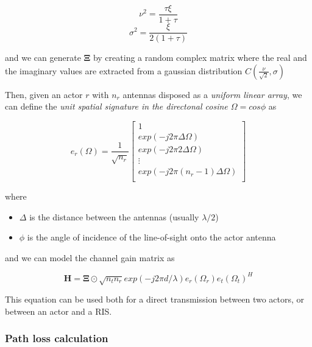 \begin{equation}
  \nu^2 = \frac{\tau \xi}{1 + \tau}
\end{equation}
\begin{equation}
  \sigma^2 = \frac{\xi}{2(1 + \tau)}
\end{equation}

and we can generate $\bm{\Xi}$ by creating a random complex matrix where the real and the imaginary values are extracted from a gaussian distribution $C(\frac{\nu}{\sqrt{2}}, \sigma)$ \cite{Rice_distribution}

Then, given an actor $r$ with $n_r$ antennas disposed as a \textit{uniform linear array}, we can define the \textit{unit spatial signature in the directonal cosine $\Omega = cos \phi$} \cite{Fundamentals_Wireless_Communication_chapter7} as

\begin{equation}
  e_r(\Omega) = \frac{1}{\sqrt{n_r}}
  \begin{bmatrix}
    1                                \\
    exp(-j2\pi\Delta\Omega)          \\
    exp(-j2\pi2\Delta\Omega)         \\
    \vdots                           \\
    exp(-j2\pi(n_r - 1)\Delta\Omega) \\
  \end{bmatrix}
\end{equation}

where
\begin{itemize}
  \item $\Delta$ is the distance between the antennas (usually $\lambda / 2$)
  \item $\phi$ is the angle of incidence of the line-of-sight onto the actor antenna
\end{itemize}

and we can model the channel gain matrix \cite{Fundamentals_Wireless_Communication_chapter7} as

\begin{equation}
  \bm{H} = \bm{\Xi} \odot \sqrt{n_t n_r} exp(-j2 \pi d / \lambda) e_r(\Omega_r) e_t(\Omega_t)^H
\end{equation}

This equation can be used both for a direct transmission between two actors, or between an actor and a RIS.

\subsubsection{Path loss calculation}

